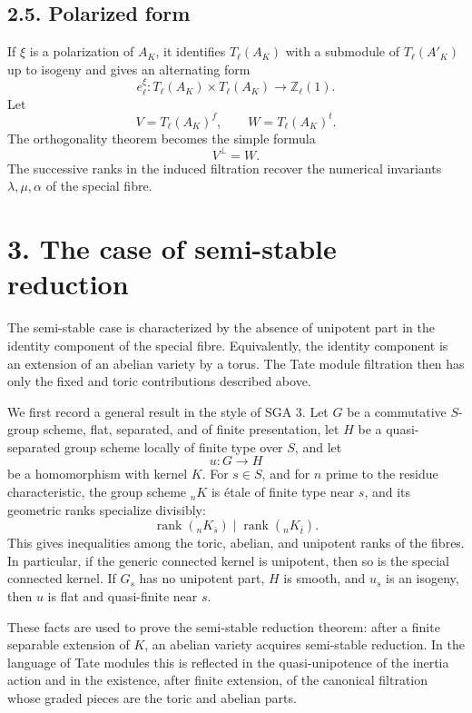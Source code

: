 \documentclass[11pt]{article}
\theoremstyle{plain}
\theoremstyle{definition}
\theoremstyle{remark}
\newcommand{\bZ}{\mathbb Z}
\begin{document}
\subsection*{2.5. Polarized form}

If \(\xi\) is a polarization of \(A_K\), it identifies \(T_\ell(A_K)\) with a
submodule of \(T_\ell(A'_K)\) up to isogeny and gives an alternating form
\[
e_\ell^\xi:T_\ell(A_K)\times T_\ell(A_K)\to \bZ_\ell(1).
\]
Let
\[
V=T_\ell(A_K)^f,\qquad W=T_\ell(A_K)^t.
\]
The orthogonality theorem becomes the simple formula
\[
V^\perp=W.
\]
The successive ranks in the induced filtration recover the numerical invariants
\(\lambda,\mu,\alpha\) of the special fibre.

\section*{3. The case of semi-stable reduction}

The semi-stable case is characterized by the absence of unipotent part in the
identity component of the special fibre. Equivalently, the identity component is
an extension of an abelian variety by a torus. The Tate module filtration then
has only the fixed and toric contributions described above.

We first record a general result in the style of SGA 3. Let \(G\) be a
commutative \(S\)-group scheme, flat, separated, and of finite presentation, let
\(H\) be a quasi-separated group scheme locally of finite type over \(S\), and
let
\[
u:G\to H
\]
be a homomorphism with kernel \(K\). For \(s\in S\), and for \(n\) prime to the
residue characteristic, the group scheme \({}_nK\) is étale of finite type near
\(s\), and its geometric ranks specialize divisibly:
\[
\operatorname{rank}({}_nK_{\bar s})\mid
\operatorname{rank}({}_nK_{\bar t}).
\]
This gives inequalities among the toric, abelian, and unipotent ranks of the
fibres. In particular, if the generic connected kernel is unipotent, then so is
the special connected kernel. If \(G_s\) has no unipotent part, \(H\) is smooth,
and \(u_s\) is an isogeny, then \(u\) is flat and quasi-finite near \(s\).

These facts are used to prove the semi-stable reduction theorem: after a finite
separable extension of \(K\), an abelian variety acquires semi-stable reduction.
In the language of Tate modules this is reflected in the quasi-unipotence of the
inertia action and in the existence, after finite extension, of the canonical
filtration whose graded pieces are the toric and abelian parts.
\end{document}

